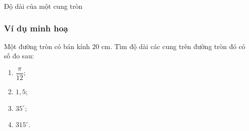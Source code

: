 

\begin{dang}{Độ dài của một cung tròn}
	
\end{dang}
\subsubsection{Ví dụ minh hoạ}
\begin{vd}%
	Một đường tròn có bán kính $20$ cm. Tìm độ dài các cung trên đường tròn đó có số đo sau:
	\begin{multicols}{4}
		\begin{enumerate}
			\item $\dfrac{\pi}{12}$;
			\item $1{,}5$;
			\item $35^\circ$;
			\item $315^\circ$.
		\end{enumerate}
	\end{multicols}
\end{vd}
